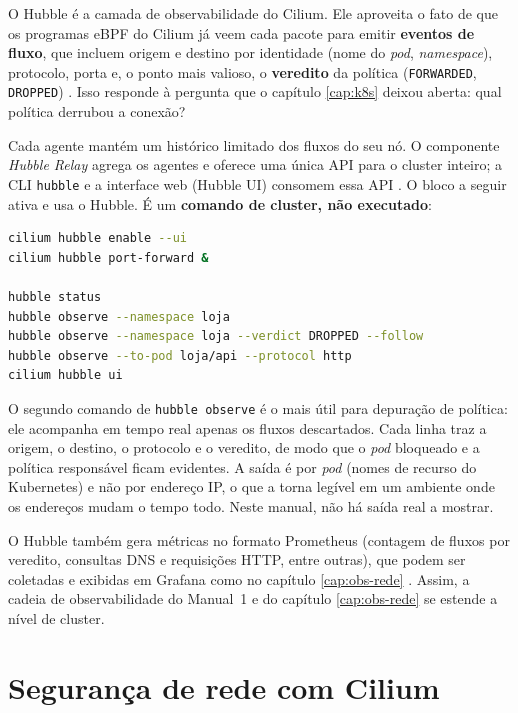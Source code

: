 O Hubble é a camada de observabilidade do Cilium. Ele aproveita o fato de que os
programas eBPF do Cilium já veem cada pacote para emitir \textbf{eventos de fluxo},
que incluem origem e destino por identidade (nome do \textit{pod}, \textit{namespace}),
protocolo, porta e, o ponto mais valioso, o \textbf{veredito} da política
(\texttt{FORWARDED}, \texttt{DROPPED}) \cite{hubbledocs}. Isso responde à pergunta
que o capítulo \ref{cap:k8s} deixou aberta: qual política derrubou a conexão?

Cada agente mantém um histórico limitado dos fluxos do seu nó. O componente
\textit{Hubble Relay} agrega os agentes e oferece uma única API para o cluster inteiro;
a CLI \texttt{hubble} e a interface web (Hubble UI) consomem essa API
\cite{hubbledocs}. O bloco a seguir ativa e usa o Hubble. É um \textbf{comando de
cluster, não executado}:

\begin{lstlisting}[language=bash, caption={Ativação e consulta de fluxos com o Hubble (comando de cluster, não executado).}, label=lst:hubble-observe]
cilium hubble enable --ui
cilium hubble port-forward &

hubble status
hubble observe --namespace loja
hubble observe --namespace loja --verdict DROPPED --follow
hubble observe --to-pod loja/api --protocol http
cilium hubble ui
\end{lstlisting}

O segundo comando de \texttt{hubble observe} é o mais útil para depuração de
política: ele acompanha em tempo real apenas os fluxos descartados. Cada linha traz a
origem, o destino, o protocolo e o veredito, de modo que o \textit{pod} bloqueado e a
política responsável ficam evidentes. A saída é por \textit{pod} (nomes de recurso do
Kubernetes) e não por endereço IP, o que a torna legível em um ambiente onde os
endereços mudam o tempo todo. Neste manual, não há saída real a mostrar.

O Hubble também gera métricas no formato Prometheus (contagem de fluxos por
veredito, consultas DNS e requisições HTTP, entre outras), que podem ser coletadas e
exibidas em Grafana como no capítulo \ref{cap:obs-rede} \cite{hubbledocs,
prometheusdocs, grafanadocs}. Assim, a cadeia de observabilidade do Manual~1 e do
capítulo \ref{cap:obs-rede} se estende a nível de cluster.

\section{Segurança de rede com Cilium}

